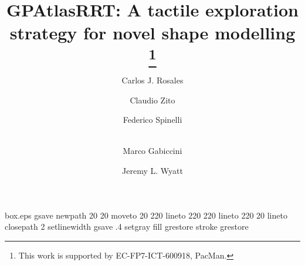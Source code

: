 \RequirePackage{fix-cm}

\begin{filecontents*}{box.eps}
gsave
newpath
  20 20 moveto
  20 220 lineto
  220 220 lineto
  220 20 lineto
closepath
2 setlinewidth
gsave
  .4 setgray fill
grestore
stroke
grestore
\end{filecontents*}

\documentclass[twocolumn,natbib,draft]{svjour3}
\smartqed  %

\usepackage{graphicx}
\graphicspath{ {./img/} {../img/} }

\usepackage{multirow}
\usepackage{colortbl}
\usepackage{booktabs}
\usepackage[algoruled,vlined]{algorithm2e}
\usepackage{amsmath,amsfonts,amssymb,amsxtra,amsbsy,amsopn}
\usepackage{paralist}

\usepackage[textsize=tiny]{todonotes}

\usepackage[inline]{showlabels}
\renewcommand{\showlabelfont}{\scriptsize\scshape\bfseries\color{blue}}



\title{%
        GPAtlasRRT: A tactile exploration strategy for novel shape modelling
  \thanks{This work is supported by EC-FP7-ICT-600918, PacMan.}
}

\author{Carlos J. Rosales         \and
        Claudio Zito              \and
        Federico Spinelli         \and \\
        Marco Gabiccini           \and
        Jeremy L. Wyatt
}


